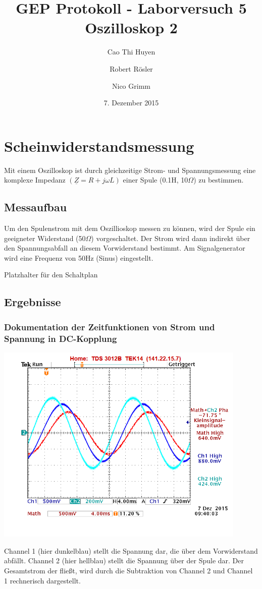 \documentclass[11pt,a4paper,titlepage]{article}
\begin{document}
\title{GEP Protokoll - Laborversuch 5\\
Oszilloskop 2}
\author{Cao Thi Huyen \and Robert R\"osler \and Nico Grimm}
\date{7. Dezember 2015}
\maketitle
\section{Scheinwiderstandsmessung}
Mit einem Oszilloskop ist durch gleichzeitige Strom- und Spannungsmessung eine komplexe Impedanz \((\underline{Z}=R+j\omega L)\) einer Spule (0.1H, 10$\Omega$) zu bestimmen.
\subsection{Messaufbau}
Um den Spulenstrom mit dem Oszillioskop messen zu k\"onnen, wird der Spule ein geeigneter Widerstand (50$\Omega$) vorgeschaltet. Der Strom wird dann indirekt \"uber den Spannungsabfall an diesem Vorwiderstand bestimmt. Am Signalgenerator wird eine Frequenz von 50Hz (Sinus) eingestellt.
\begin{center}
Platzhalter f\"ur den Schaltplan
\end{center}
\subsection{Ergebnisse}
\subsubsection{Dokumentation der Zeitfunktionen von Strom und Spannung in DC-Kopplung}

\begin{center}
\includegraphics[width=0.9\textwidth]{5_1_1}
\end{center}
Channel 1 (hier dunkelblau) stellt die Spannung dar, die \"uber dem Vorwiderstand abf\"allt. Channel 2 (hier hellblau) stellt die Spannung \"uber der Spule dar. Der Gesamtstrom der flie\ss{}t, wird durch die Subtraktion von Channel 2 und Channel 1 rechnerisch dargestellt.
\newpage
\end{document}

